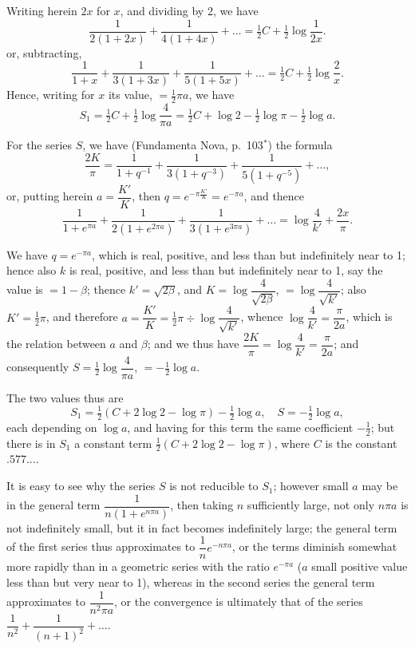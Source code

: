 \documentclass[11pt,a4paper]{book}
\begin{document}
Writing herein $2x$ for $x$, and dividing by 2, we have
\[
\frac{1}{2(1+2x)} + \frac{1}{4(1+4x)} + \ldots = \tfrac{1}{2}C + \tfrac{1}{2}\log\frac{1}{2x}.
\]
or, subtracting,
\[
\frac{1}{1+x} + \frac{1}{3(1+3x)} + \frac{1}{5(1+5x)} + \ldots = \tfrac{1}{2}C + \tfrac{1}{2}\log\frac{2}{x}.
\]
Hence, writing for $x$ its value, $= \tfrac{1}{2}\pi a$, we have
\[
S_1 = \tfrac{1}{2}C + \tfrac{1}{2}\log\frac{4}{\pi a} = \tfrac{1}{2}C + \log 2 - \tfrac{1}{2}\log\pi - \tfrac{1}{2}\log a.
\]

For the series $S$, we have (Fundamenta Nova, p.\ 103$^*$) the formula
\[
\frac{2K}{\pi} = \frac{1}{1+q^{-1}} + \frac{1}{3(1+q^{-3})} + \frac{1}{5(1+q^{-5})} + \ldots,
\]
or, putting herein $a = \dfrac{K'}{K}$, then $q = e^{-\pi\frac{K'}{K}} = e^{-\pi a}$, and thence
\[
\frac{1}{1+e^{\pi a}} + \frac{1}{2(1+e^{2\pi a})} + \frac{1}{3(1+e^{3\pi a})} + \ldots = \log\frac{4}{k'} + \frac{2x}{\pi}.
\]

We have $q = e^{-\pi a}$, which is real, positive, and less than but indefinitely near to 1; hence also $k$ is real, positive, and less than but indefinitely near to 1, say the value is $= 1 - \beta$; thence $k' = \sqrt{2\beta}$, and $K = \log\dfrac{4}{\sqrt{2\beta}}$, $= \log\dfrac{4}{\sqrt{k'}}$; also $K' = \tfrac{1}{2}\pi$, and therefore $a = \dfrac{K'}{K} = \tfrac{1}{2}\pi \div \log\dfrac{4}{\sqrt{k'}}$, whence $\log\dfrac{4}{k'} = \dfrac{\pi}{2a}$, which is the relation between $a$ and $\beta$; and we thus have $\dfrac{2K}{\pi} = \log\dfrac{4}{k'} = \dfrac{\pi}{2a}$; and consequently $S = \tfrac{1}{2}\log\dfrac{4}{\pi a}$, $= -\tfrac{1}{2}\log a$.

The two values thus are
\[
S_1 = \tfrac{1}{2}(C + 2\log 2 - \log\pi) - \tfrac{1}{2}\log a,\quad S = -\tfrac{1}{2}\log a,
\]
each depending on $\log a$, and having for this term the same coefficient $-\tfrac{1}{2}$; but there is in $S_1$ a constant term $\tfrac{1}{2}(C + 2\log 2 - \log\pi)$, where $C$ is the constant $.577\ldots$.

It is easy to see why the series $S$ is not reducible to $S_1$; however small $a$ may be in the general term $\dfrac{1}{n(1+e^{n\pi a})}$, then taking $n$ sufficiently large, not only $n\pi a$ is not indefinitely small, but it in fact becomes indefinitely large; the general term of the first series thus approximates to $\dfrac{1}{n}e^{-n\pi a}$, or the terms diminish somewhat more rapidly than in a geometric series with the ratio $e^{-\pi a}$ ($a$ small positive value less than but very near to 1), whereas in the second series the general term approximates to $\dfrac{1}{n^2\pi a}$, or the convergence is ultimately that of the series $\dfrac{1}{n^2} + \dfrac{1}{(n+1)^2} + \ldots$.
\end{document}
